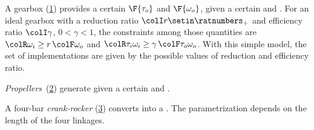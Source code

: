 
\begin{example}
    A gearbox (\cref{fig:gearbox}) provides a certain  $\F{\tau_o}$ and  $\F{\omega_o}$, given a certain  and .
    For an ideal gearbox with a reduction ratio ${\colI r} \setin \ratnumbers_+$ and efficiency ratio $\colI\gamma$, $0<\gamma<1$, the constraints among those quantities are ${\colR \omega_i}\geq r\,{\colF \omega_o}$ and ${\colR \tau_i\omega_i}\geq\gamma\,{\colF \tau_o\omega_o}$.
    With this simple model, the set of implementations are given by the possible values of reduction and efficiency ratio.
\end{example}

\begin{figure}[h!]
    \centering
    \caption{}
    \label{fig:gearbox}
\end{figure}

\begin{example}
    \emph{Propellers}~(\cref{fig:propeller}) generate  given a certain  and .
\end{example}
\begin{figure}[h!]
    \centering
    \caption{}
    \label{fig:propeller}
\end{figure}

\begin{example}
    A four-bar \emph{crank-rocker} (\cref{fig:crack}) converts  into a .
    The parametrization depends on the length of the four linkages.
\end{example}

\begin{figure}[h!]
    \centering
    \caption{}
    \label{fig:crack}
\end{figure}

